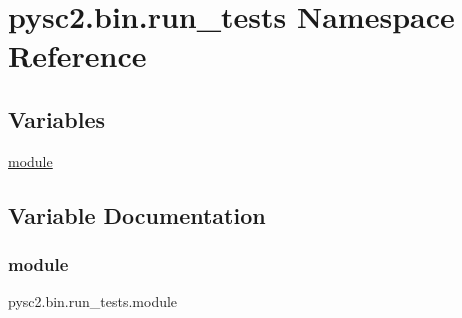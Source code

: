\hypertarget{namespacepysc2_1_1bin_1_1run__tests}{}\section{pysc2.\+bin.\+run\+\_\+tests Namespace Reference}
\label{namespacepysc2_1_1bin_1_1run__tests}
\subsection*{Variables}
\begin{DoxyCompactItemize}
\item 
\mbox{\hyperlink{namespacepysc2_1_1bin_1_1run__tests_a5a66da55af184106e25e2480fac97835}{module}}
\end{DoxyCompactItemize}


\subsection{Variable Documentation}
\mbox{\label{namespacepysc2_1_1bin_1_1run__tests_a5a66da55af184106e25e2480fac97835}} 
\subsubsection{\texorpdfstring{module}{module}}
{\footnotesize\ttfamily pysc2.\+bin.\+run\+\_\+tests.\+module}


